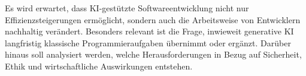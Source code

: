 Es wird erwartet, dass KI-gestützte Softwareentwicklung nicht nur Effizienzsteigerungen ermöglicht, sondern auch die Arbeitsweise von Entwicklern nachhaltig verändert. Besonders relevant ist die Frage, inwieweit generative KI langfristig klassische Programmieraufgaben übernimmt oder ergänzt. Darüber hinaus soll analysiert werden, welche Herausforderungen in Bezug auf Sicherheit, Ethik und wirtschaftliche Auswirkungen entstehen.